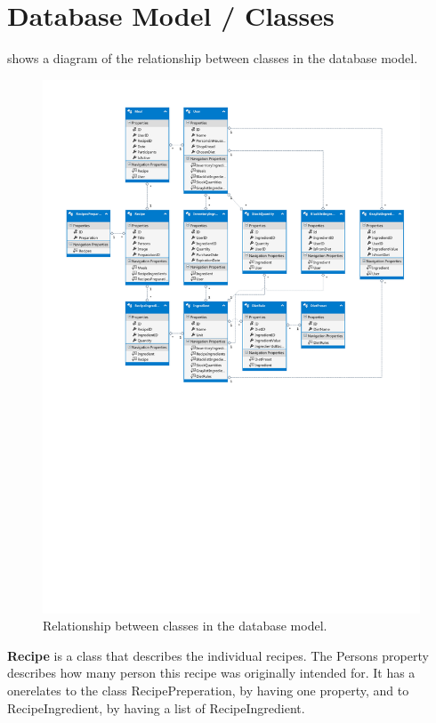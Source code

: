 \section{Database Model / Classes} \label{DataBaseModel/Classes}
 shows a diagram of the relationship between classes in the database model.

\begin{figure}[H]
	\centering
    \includegraphics[width=1\textwidth, trim=0 350 0 0]{Grafik/FoodDatabase.pdf}
	\caption{Relationship between classes in the database model.}
	\label{DatabaseModel}
\end{figure}

\textbf{Recipe} is a class that describes the individual recipes. The Persons property describes how many person this recipe was originally intended for. It has a onerelates to the class RecipePreperation, by having one property, and to RecipeIngredient, by having a list of RecipeIngredient. 

